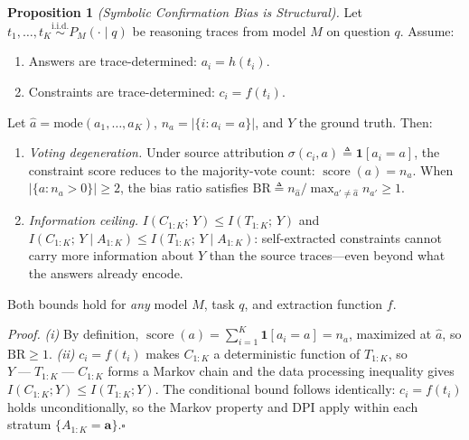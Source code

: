 
\textbf{Proposition 1} \textit{(Symbolic Confirmation Bias is Structural).}\;%
Let $t_1, \dots, t_K \overset{\mathrm{i.i.d.}}{\sim} P_M(\cdot \mid q)$ be reasoning traces from model $M$ on question $q$.
Assume:
\begin{enumerate}[label=\textbf{A\arabic*.},leftmargin=2.5em,nosep]
\item Answers are trace-determined: $a_i = h(t_i)$.
\item Constraints are trace-determined: $c_i = f(t_i)$.
\end{enumerate}
Let $\hat{a} = \mathrm{mode}(a_1, \dots, a_K)$, $n_a = |\{i : a_i = a\}|$, and $Y$ the ground truth. Then:
\begin{enumerate}[label=\textit{(\roman*)},leftmargin=1.8em,itemsep=2pt,topsep=3pt]
\item \textit{Voting degeneration.}\;
Under source attribution $\sigma(c_i, a) \triangleq \mathbf{1}[a_i = a]$, the constraint score reduces to the majority-vote count: $\operatorname{score}(a) = n_a$.
When $|\{a : n_a > 0\}| \geq 2$, the bias ratio satisfies $\mathrm{BR} \triangleq n_{\hat{a}} \big/ \max_{a' \neq \hat{a}} n_{a'} \geq 1$.

\item \textit{Information ceiling.}\;
$I(C_{1:K};\, Y) \leq I(T_{1:K};\, Y)$ and $I(C_{1:K};\, Y \mid A_{1:K}) \leq I(T_{1:K};\, Y \mid A_{1:K})$:
self-extracted constraints cannot carry more information about $Y$ than the source traces---even beyond what the answers already encode.
\end{enumerate}
\noindent
Both bounds hold for \emph{any} model $M$, task $q$, and extraction function $f$.

\medskip
\textit{Proof.}\;%
\textit{(i)}\; By definition, $\operatorname{score}(a) = \sum_{i=1}^K \mathbf{1}[a_i = a] = n_a$, maximized at $\hat{a}$, so $\mathrm{BR} \geq 1$.
\textit{(ii)}\; $c_i = f(t_i)$ makes $C_{1:K}$ a deterministic function of $T_{1:K}$, so $Y \mathop{\text{---}} T_{1:K} \mathop{\text{---}} C_{1:K}$ forms a Markov chain and the data processing inequality gives $I(C_{1:K}; Y) \leq I(T_{1:K}; Y)$.
The conditional bound follows identically: $c_i = f(t_i)$ holds unconditionally, so the Markov property and DPI apply within each stratum $\{A_{1:K} = \mathbf{a}\}$.\hfill$\square$

